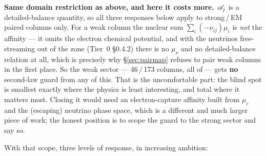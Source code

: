 \begin{warn}
\textbf{Same domain restriction as above, and here it costs more.} $\mathscr{A}_j$ is a
detailed-balance quantity, so all three responses below apply to strong\,/\,EM
paired columns only. For a weak column the nuclear sum
$\sum_i(-\nu_{ij})\mu_i$ is \emph{not} the affinity --- it omits the electron
chemical potential, and with the neutrinos free-streaming out of the zone
(Tier~0 \S0.4.2) there is no $\mu_\nu$ and no detailed-balance relation at all,
which is precisely why \S\ref{sec:pairmap} refuses to pair weak columns in the
first place. So the weak sector --- 46\,/\,173 columns, all of \dYe{} --- gets
\textbf{no} second-law guard from any of this. That is the uncomfortable part:
the blind spot is smallest exactly where the physics is least interesting, and
total where it matters most. Closing it would need an electron-capture affinity
built from $\mu_e$ and the (escaping) neutrino phase space, which is a different
and much larger piece of work; the honest position is to scope the guard to the
strong sector and say so.
\end{warn}

With that scope, three levels of response, in increasing ambition:

